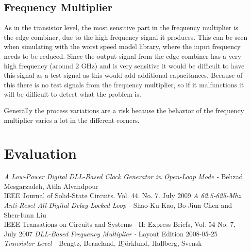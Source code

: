 \documentclass[a4paper,12pt]{article} \usepackage{graphicx}
\begin{document}
\subsection{Frequency Multiplier}
As in the transistor level, the most sensitive part in the frequency
multiplier is the edge combiner, due to the high frequency signal it produces.
This can be seen when simulating with the worst speed model library, where the
input frequency needs to be reduced. Since the output signal from the edge
combiner has a very high frequency (around 2 GHz) and is very sensitive it would
be difficult to have this signal as a test signal as this would add additional
capacitances. Because of this there is no test signals from the frequency
multiplier, so if it malfunctions it will be difficult to detect what the
problem is.

Generally the process variations are a risk because the behavior of the
frequency multiplier varies a lot in the different corners.


\section{Evaluation}


\newpage
\appendix 
\newpage

\begin{thebibliography}{99}
        \textit{A Low-Power Digital DLL-Based Clock Generator in Open-Loop Mode - }
                Behzad Mesgarzadeh, Atila Alvandpour \\
                IEEE Journal of Solid-State Circuits. Vol. 44. No. 7. July 2009
        \textit{A 62.5-625-Mhz Anti-Reset All-Digital Delay-Locked Loop - }
                Shao-Ku Kao, Bo-Jiun Chen and Shen-Iuan Liu \\
                IEEE Transations on Circuits and Systems - II: Express Briefs, Vol. 54 No. 7, July 2007
        \textit{DLL-Based Frequency Multiplier - }
                Layout Edition 2008-05-25 \\
        \textit{Transistor Level - }
                Bengtz, Berneland, Björklund, Hallberg, Svensk \\

\end{thebibliography}
\end{document}
